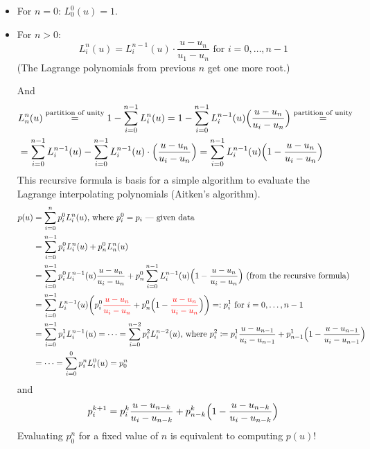 \begin{itemize}
    \item {
        For $n = 0$: $L_0^0(u) = 1$.
    }
    \item {
        For $n > 0$:
        \[
            L_i^n(u) = L_i^{n - 1}(u) \cdot \frac{u - u_n}{u_1 - u_n}
            \text{ for } i = 0, \dots, n - 1
        \]
        (The Lagrange polynomials from previous $n$ get one more root.)

        And
        \begin{align*}
            &
            L_n^n(u) \overset{\text{partition of unity}}{=} 1 - \sum_{i=0}^{n - 1} L_i^n(u) =
            1 - \sum_{i=0}^{n-1} L_i^{n-1}(u)\Bigl(\frac{u - u_n}{u_i - u_n}\Bigr)
            \overset{\text{partition of unity}}{=}
            \\&
            = \sum_{i=0}^{n-1} L_i^{n-1}(u)
            -\sum_{i=0}^{n-1} L_i^{n-1}(u) \cdot \Bigl(
                \frac{u - u_n}{u_i - u_n}
            \Bigr) =
            \sum_{i=0}^{n-1} L_i^{n-1}(u) 
            \Bigl(1 - \frac{u - u_n}{u_i - u_n}\Bigr)
        \end{align*}
        This recursive formula is basis for a simple algorithm to evaluate
        the Lagrange interpolating polynomials (Aitken's algorithm).
        \begin{align*}
            p(u) &= \sum_{i=0}^n p_i^0 L_i^n(u)
            \text{, where } p_i^0 = p_i \text{ --- given data}
            \\&= \sum_{i=0}^{n-1} p_i^0 L_i^n(u) + p_n^0 L_n^n(u)
            \\&= \sum_{i=0}^{n-1} p_i^0 L_{i}^{n-1}(u) \frac{u - u_n}{u_i - u_n} +
            p_n^0 \sum_{i=0}^{n-1} L_{i}^{n-1}(u) \Bigl(1 - \frac{u - u_n}{u_i - u_n}\Bigr)
            \text{ (from the recursive formula)}
            \\&= \sum_{i=0}^{n - 1} L_i^{n-1}(u) \biggl(
                p_i^0 \textcolor{red}{\frac{u - u_n}{u_i - u_n}} + p_n^0 \Bigl(
                    1 - \textcolor{red}{\frac{u - u_n}{u_i - u_n}}
                \Bigr)
            \biggr) =: p_i^1 \text{ for } i = 0, \dots, n - 1
            \\&= \sum_{i=0}^{n-1} p_i^1 L_i^{n-1}(u) = \dots
            = \sum_{i=0}^{n-2} p_i^2 L_i^{n-2}(u)
            \text{, where } p_i^2 \coloneqq
            p_i^1 \frac{u - u_{n-1}}{u_i - u_{n-1}} + p_{n-1}^1 \Bigl(
                    1 - \frac{u - u_{n-1}}{u_i - u_{n-1}}
            \Bigr)
            \\&= \dots = \sum_{i=0}^0 p_i^n L_i^0(u) = p_0^n
        \end{align*}
        and
        \[
            p_i^{k+1} = p_i^k \frac{u - u_{n-k}}{u_i - u_{n-k}} + p_{n-k}^k \Bigl(
            1 - \frac{u - u_{n-k}}{u_i - u_{n-k}}\Bigr)
        \]
        Evaluating $p_0^n$ for a fixed value of $n$ is equivalent
        to computing $p(u)$!
    }
\end{itemize}

